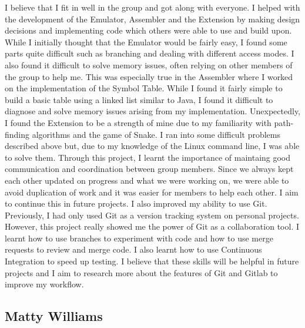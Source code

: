 \documentclass[11pt]{article}
\begin{document}
I believe that I fit in well in the group and got along with everyone. I helped with the development of the Emulator, Assembler and the Extension by 
making design decisions and implementing code which others were able to use and build upon. While I initially thought that the Emulator would be fairly easy, 
I found some parts quite difficult such as branching and dealing with different access modes. I also found it difficult to solve memory issues, often relying on 
other members of the group to help me. This was especially true in the Assembler where I worked on the implementation of the Symbol Table. While I found it fairly 
simple to build a basic table using a linked list similar to Java, I found it difficult to diagnose and solve memory issues arising from my implementation. 
Unexpectedly, I found the Extension to be a strength of mine due to my familiarity with path-finding algorithms and the game of Snake. I ran into some difficult 
problems described above but, due to my knowledge of the Linux command line, I was able to solve them.
\newline
Through this project, I learnt the importance of maintaing good communication and coordination between group members. Since we always kept each other updated 
on progress and what we were working on, we were able to avoid duplication of work and it was easier for members to help each other. I aim to continue this in 
future projects. I also improved my ability to use Git. Previously, I had only used Git as a version tracking system on personal projects. However, this project 
really showed me the power of Git as a collaboration tool. I learnt how to use branches to experiment with code and how to use merge requests to review and merge code. 
I also learnt how to use Continuous Integration to speed up testing. I believe that these skills will be helpful in future projects and I aim to research more about 
the features of Git and Gitlab to improve my workflow.

\subsection{Matty Williams}
\end{document}
